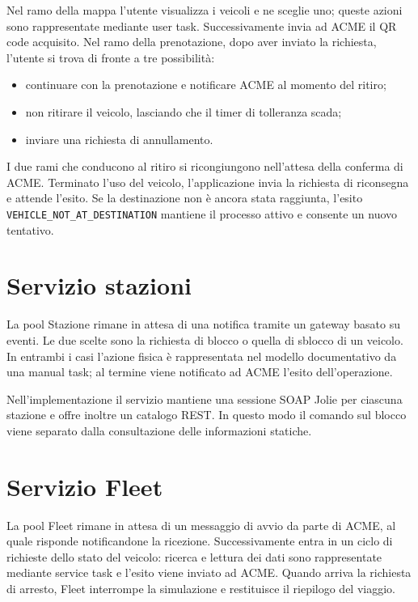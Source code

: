 \documentclass[12pt,a4paper,twoside]{report}
\newcommand{\code}[1]{\texttt{#1}}
\begin{document}
Nel ramo della mappa l'utente visualizza i veicoli e ne sceglie uno; queste
azioni sono rappresentate mediante user task. Successivamente invia ad ACME
il QR code acquisito. Nel ramo della prenotazione, dopo aver inviato la
richiesta, l'utente si trova di fronte a tre possibilità:
\begin{itemize}
  \item continuare con la prenotazione e notificare ACME al momento del ritiro;
  \item non ritirare il veicolo, lasciando che il timer di tolleranza scada;
  \item inviare una richiesta di annullamento.
\end{itemize}
I due rami che conducono al ritiro si ricongiungono nell'attesa della conferma
di ACME. Terminato l'uso del veicolo, l'applicazione invia la richiesta di
riconsegna e attende l'esito. Se la destinazione non è ancora stata raggiunta,
l'esito \code{VEHICLE\_NOT\_AT\_DESTINATION} mantiene il processo attivo e
consente un nuovo tentativo.

\section{Servizio stazioni}

La pool Stazione rimane in attesa di una notifica tramite un gateway basato
su eventi. Le due scelte sono la richiesta di blocco o quella di sblocco di
un veicolo. In entrambi i casi l'azione fisica è rappresentata nel modello
documentativo da una manual task; al termine viene notificato ad ACME l'esito
dell'operazione.

Nell'implementazione il servizio mantiene una sessione SOAP Jolie per ciascuna
stazione e offre inoltre un catalogo REST. In questo modo il comando sul
blocco viene separato dalla consultazione delle informazioni statiche.

\section{Servizio Fleet}

La pool Fleet rimane in attesa di un messaggio di avvio da parte di ACME, al
quale risponde notificandone la ricezione. Successivamente entra in un ciclo
di richieste dello stato del veicolo: ricerca e lettura dei dati sono
rappresentate mediante service task e l'esito viene inviato ad ACME. Quando
arriva la richiesta di arresto, Fleet interrompe la simulazione e restituisce
il riepilogo del viaggio.
\end{document}
